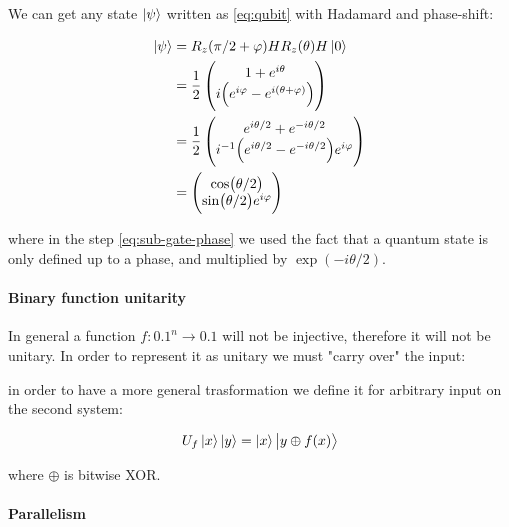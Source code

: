 \documentclass[main.tex]{subfiles}
\begin{document}
\begin{bluebox}
We can get any state \(\ket{\psi }\) written as \eqref{eq:qubit} with Hadamard and phase-shift:

\begin{subequations}
\begin{align}
  \ket{\psi }  &= R_z(\pi/2 + \varphi) H R_z(\theta) H\ket{0}  \\
  &= \frac{1}{2} \begin{pmatrix}
    1 + e^{i \theta} \\
     i  \qty(e^{i \varphi}  - e^{i (\theta + \varphi)})
  \end{pmatrix}  \\
  &= \label{eq:sub-gate-phase}
  \frac{1}{2} \begin{pmatrix}
    e^{i \theta /2} + e^{-i \theta /2} \\
    i^{-1} \qty(e^{i \theta/2} - e^{-i \theta/2}) e^{i \varphi}
\end{pmatrix}  \\
 &= \begin{pmatrix}
 \cos(\theta/2)  \\
 \sin(\theta/2) e^{i \varphi}
 \end{pmatrix}
\end{align}
\end{subequations}

where in the step \eqref{eq:sub-gate-phase} we used the fact that a quantum state is only defined up to a phase, and multiplied by \(\exp(-i \theta/2) \).
\end{bluebox}


\paragraph{Binary function unitarity}

In general a function \(f: \qty{0,1}^n \rightarrow \qty{0,1}\) will not be injective, therefore it will not be unitary. In order to represent it as unitary we must "carry over" the input:


in order to have a more general trasformation we define it for arbitrary input on the second system:

\begin{equation}
    U_f \ket{x} \ket{y} = \ket{x} \ket{y \oplus f(x)}
\end{equation}

where \(\oplus\) is bitwise XOR.

\paragraph{Parallelism}
\end{document}
